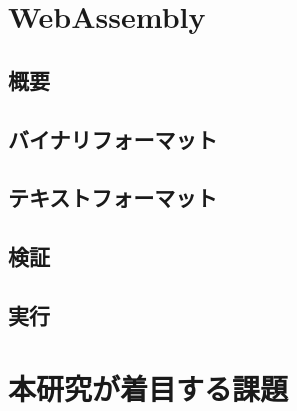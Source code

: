 \section{WebAssembly}

\subsection{概要}

\subsection{バイナリフォーマット}

\subsection{テキストフォーマット}

\subsection{検証}

\subsection{実行}

\section{本研究が着目する課題}

